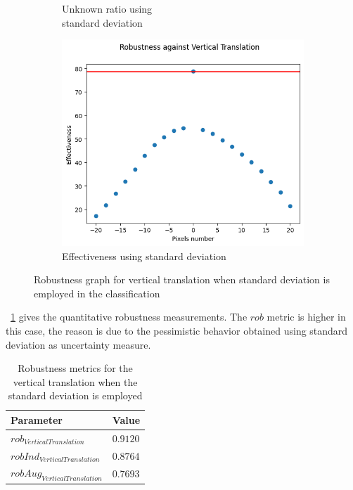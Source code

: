 \begin{figure}[h]
\begin{subfigure}{.33\textwidth}
		\caption{Unknown ratio using \\ standard deviation}
		\label{fig:vt_vu_unkn}
	\end{subfigure}%
	\begin{subfigure}{.33\textwidth}
		\centering
		\includegraphics[width=0.9\linewidth]{ImageFiles/EvalBNN/VT/VU/eff}
		\caption{Effectiveness using standard deviation}
		\label{fig:vt_vu_eff}
	\end{subfigure}
	\caption{Robustness graph for vertical translation when standard deviation is employed in the classification}
	\label{fig:vt_vu}
\end{figure}

\Tab~\ref{table:rob_vt_vu} gives the quantitative robustness measurements. The $rob$ metric is higher in this case, the reason is due to the pessimistic behavior obtained using standard deviation as uncertainty measure.

\begin{table}[h]
	\centering
	\begin{tabular}{|| l | l ||} 
		\hline
		\textbf{Parameter} & \textbf{Value} \\
		\hline
		\hline
		$rob_{VerticalTranslation}$ & $0.9120$ \\
		$robInd_{VerticalTranslation}$ & $0.8764$ \\
		$robAug_{VerticalTranslation}$ & $0.7693$ \\	
		\hline
	\end{tabular}	
	\caption{Robustness metrics for the vertical translation when the standard deviation is employed}
	\label{table:rob_vt_vu}
\end{table}

